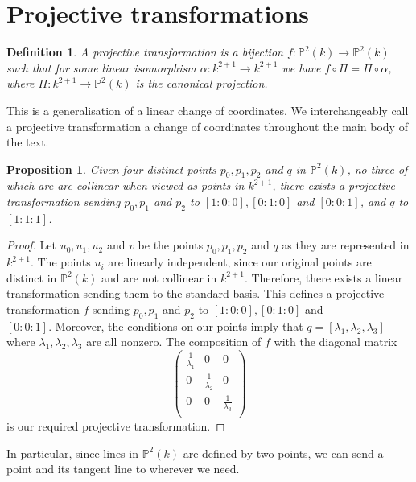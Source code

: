 \documentclass{article}
\newtheorem*{proposition*}{Proposition}
\newtheorem*{definition}{Definition}
\theoremstyle{remark}
\begin{document}
\section{Projective transformations}
\begin{definition}
A projective transformation is a bijection $f:\mathbb{P}^{2}(k) \to \mathbb{P}^{2}(k)$ such that for some linear isomorphism $\alpha : k^{2+1} \to k^{2+1}$ we have $f \circ \Pi = \Pi \circ \alpha$, where $\Pi : k^{2+1} \to \mathbb{P}^{2}(k)$ is the canonical projection.
\end{definition}
This is a generalisation of a linear change of coordinates. We interchangeably call a projective transformation a change of coordinates throughout the main body of the text.
\begin{proposition*} 
Given four distinct points $p_0, p_1, p_2$ and $q$ in $\mathbb{P}^{2}(k)$, no three of which are are collinear when viewed as points in $k^{2+1}$, there exists a projective transformation sending $p_0, p_1$ and $p_2$ to $[1:0:0], [0:1:0]$ and $[0:0:1]$, and $q$ to $[1:1:1]$.
\end{proposition*}
\begin{proof}
Let $u_0, u_1, u_2$ and $v$ be the points $p_0, p_1, p_2$ and $q$ as they are represented in $k^{2+1}$. The points $u_i$ are linearly independent, since our original points are distinct in $\mathbb{P}^{2}(k)$ and are not collinear in $k^{2+1}$. Therefore, there exists a linear transformation sending them to the standard basis. This defines a projective transformation $f$ sending $p_0, p_1$ and $p_2$ to $[1:0:0], [0:1:0]$ and \\ $[0:0:1]$. Moreover, the conditions on our points imply that $q=[\lambda_1,\lambda_2,\lambda_3]$ where $\lambda_1,\lambda_2,\lambda_3$ are all nonzero. The composition of $f$ with the diagonal matrix 
\[\begin{pmatrix}
  \frac{1}{\lambda_1} &     0                           & 0                                \\
   0                             & \frac{1}{\lambda_2} & 0                                 \\
   0                             &  0                             &  \frac{1}{\lambda_3}    \\
 \end{pmatrix}\]
 is our required projective transformation.
\end{proof}
In particular, since lines in $\mathbb{P}^{2}(k)$ are defined by two points, we can send a point and its tangent line to wherever we need.
\end{document}
